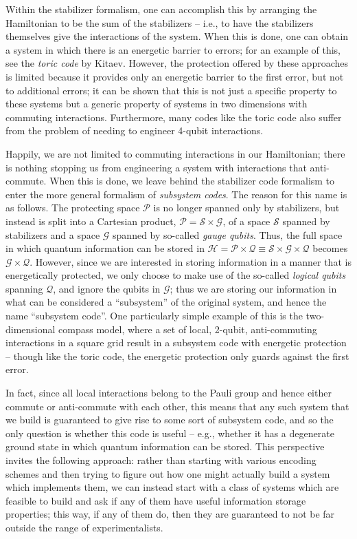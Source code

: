 \documentclass[twocolumn,showpacs,preprintnumbers,amsmath,amssymb,nofootinbib,pra,floatfix]{revtex4}
\begin{document}
Within the stabilizer formalism, one can accomplish this by arranging the Hamiltonian to be the sum of the stabilizers -- i.e., to have the stabilizers themselves give the interactions of the system.  When this is done, one can obtain a system in which there is an energetic barrier to errors;  for an example of this, see  the \emph{toric code} by Kitaev.  However, the protection offered by these approaches is limited because it  provides only an energetic barrier to the first error, but not to additional errors; it can be shown that this is not just a specific property to these systems but a generic property of systems in two dimensions with commuting interactions.  Furthermore, many codes like the toric code also suffer from the problem of needing to engineer 4-qubit interactions.

Happily, we are not limited to commuting interactions in our Hamiltonian;  there is nothing stopping us from engineering a system with interactions that anti-commute.  When this is done, we leave behind the stabilizer code formalism to enter the more general formalism of \emph{subsystem codes}.  The reason for this name is as follows.  The protecting space $\mathscr{P}$ is no longer spanned only by stabilizers, but instead is split into a Cartesian product, $\mathscr{P}=\mathscr{S}\times\mathscr{G}$, of a space $\mathscr{S}$ spanned by stabilizers and a space $\mathscr{G}$ spanned by so-called \emph{gauge qubits}.  Thus, the full space in which quantum information can be stored in $\mathscr{H}=\mathscr{P}\times\mathscr{Q}\equiv\mathscr{S}\times\mathscr{G}\times\mathscr{Q}$ becomes $\mathscr{G}\times\mathscr{Q}$.  However, since we are interested in storing information in a manner that is energetically protected, we only choose to make use of the so-called \emph{logical qubits} spanning $\mathscr{Q}$, and ignore the qubits in $\mathscr{G}$;  thus we are storing our information in what can be considered a ``subsystem'' of the original system, and hence the name ``subsystem code''.  One particularly simple example of this is the two-dimensional compass model, where a set of local, 2-qubit, anti-commuting interactions in a square grid result in a subsystem code with energetic protection -- though like the toric code, the energetic protection only guards against the first error.

In fact, since all local interactions belong to the Pauli group and hence either commute or anti-commute with each other, this means that any such system that we build is guaranteed to give rise to some sort of subsystem code, and so the only question is whether this code is useful -- e.g., whether it has a degenerate ground state in which quantum information can be stored.  This perspective invites the following approach:  rather than starting with various encoding schemes and then trying to figure out how one might actually build a system which implements them, we can instead start with a class of systems which are feasible to build and ask if any of them have useful information storage properties;  this way, if any of them do, then they are guaranteed to not be far outside the range of experimentalists. 
\end{document}

